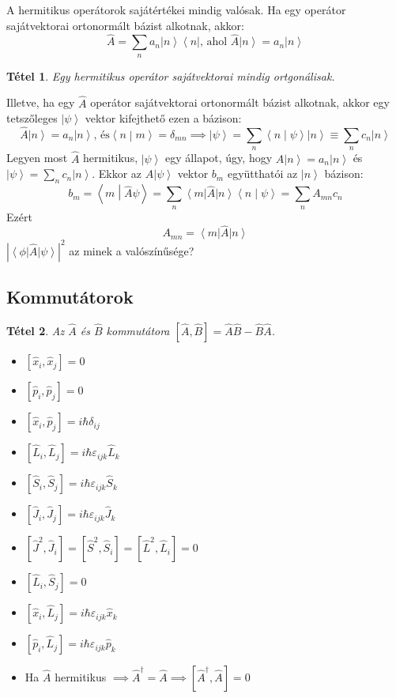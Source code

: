 \documentclass[12pt]{article}
\theoremstyle{plain}
\newcommand{\ket}[1]{\left| #1 \right >}
\newcommand{\bra}[1]{\left < #1 \right |}
\newcommand{\bracket}[2]{\left < #1 \middle | #2 \right>}
\newcommand{\commut}[2]{\left [ #1 , #2 \right]}
\newtheorem*{theorem*}{Tétel}
\begin{document}
A hermitikus operátorok sajátértékei mindig valósak. Ha egy operátor sajátvektorai ortonormált bázist alkotnak, akkor:
$$ \hat A = \sum\limits_{n} a_n \ket n \bra n \textrm{, ahol } \hat A \ket n = a_n \ket n $$
\begin{theorem*}
    Egy hermitikus operátor sajátvektorai mindig ortgonálisak.
\end{theorem*}
Illetve, ha egy $\hat A$ operátor sajátvektorai ortonormált bázist alkotnak, akkor egy tetszőleges $\ket \psi$ vektor
kifejthető ezen a bázison:
$$\hat A \ket n = a_n \ket n \textrm{, és} \bracket{n}{m} = \delta_{mn} \implies \ket\psi = \sum\limits_n \bracket{n}{\psi} \ket n 
\equiv  \sum\limits_n c_n \ket n$$ 
Legyen most $\hat A$ hermitikus, $\ket\psi$ egy állapot, úgy, hogy $\hat A \ket n = a_n\ket n$ és $\ket\psi = \sum\limits_n c_n \ket n$.
Ekkor az $\hat A \ket\psi$ vektor $b_m$ együtthatói az $\ket n$ bázison:
$$b_m = \bracket{m}{\hat A \psi} = \sum\limits_n \bra{m} \hat A \ket n \bracket{n}{\psi} = \sum\limits_n A_{mn}c_n$$
Ezért $$ A_{mn} = \bra m \hat A \ket n$$
$|\bra \phi \hat A \ket \psi|^2$ az minek a valószínűsége?

\subsection{Kommutátorok}
\begin{theorem*}
    Az $\hat A$ és $\hat B$ kommutátora $\commut{\hat A}{\hat B} = \hat A \hat B - \hat B \hat A$. 
\end{theorem*}
\begin{itemize}
    \item $\commut{\hat x_i}{\hat x_j} = 0$
    \item $\commut{\hat p_i}{\hat p_j} = 0$
    \item $\commut{\hat x_i}{\hat p_j} = i\hbar \delta_{ij}$
    \item $\commut{\hat L_i}{\hat L_j} = i \hbar \varepsilon_{ijk}\hat L_k$
    \item $\commut{\hat S_i}{\hat S_j} = i \hbar \varepsilon_{ijk}\hat S_k$
    \item $\commut{\hat J_i}{\hat J_j} = i \hbar \varepsilon_{ijk}\hat J_k$
    \item $\commut{\hat J^2}{\hat J_i} = \commut{\hat S^2}{\hat S_i} = \commut{\hat L^2}{\hat L_i} = 0$
    \item $\commut{\hat L_i}{\hat S_j} = 0$
    \item $\commut{\hat x_i}{\hat L_j} = i \hbar \varepsilon_{ijk}\hat x_k$
    \item $\commut{\hat p_i}{\hat L_j} = i \hbar \varepsilon_{ijk}\hat p_k$    
    \item Ha $\hat A$ hermitikus $\implies \hat A^\dag = \hat A \implies \commut{\hat A^\dag}{\hat A} = 0$  
    
    
\end{itemize}
\end{document}
